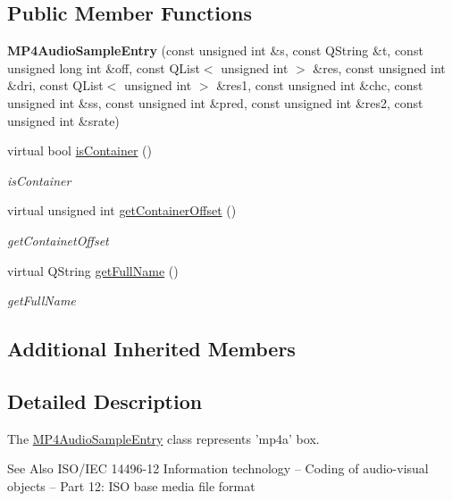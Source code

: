 \subsection*{Public Member Functions}
\begin{DoxyCompactItemize}
\item 
\hypertarget{class_m_p4_audio_sample_entry_a015738c8732d44118b8a543384e70ef2}{{\bfseries M\-P4\-Audio\-Sample\-Entry} (const unsigned int \&s, const Q\-String \&t, const unsigned long int \&off, const Q\-List$<$ unsigned int $>$ \&res, const unsigned int \&dri, const Q\-List$<$ unsigned int $>$ \&res1, const unsigned int \&chc, const unsigned int \&ss, const unsigned int \&pred, const unsigned int \&res2, const unsigned int \&srate)}\label{class_m_p4_audio_sample_entry_a015738c8732d44118b8a543384e70ef2}

\item 
virtual bool \hyperlink{class_m_p4_audio_sample_entry_a17ffcfa7b17574ed19bd38ccab77f705}{is\-Container} ()
\begin{DoxyCompactList}\small\item\em is\-Container \end{DoxyCompactList}\item 
virtual unsigned int \hyperlink{class_m_p4_audio_sample_entry_a81c5345f7b14c1fc8fe089dae5fd5793}{get\-Container\-Offset} ()
\begin{DoxyCompactList}\small\item\em get\-Containet\-Offset \end{DoxyCompactList}\item 
virtual Q\-String \hyperlink{class_m_p4_audio_sample_entry_a81d787d905a0ee6fe1158daf8cddb64d}{get\-Full\-Name} ()
\begin{DoxyCompactList}\small\item\em get\-Full\-Name \end{DoxyCompactList}\end{DoxyCompactItemize}
\subsection*{Additional Inherited Members}


\subsection{Detailed Description}
The \hyperlink{class_m_p4_audio_sample_entry}{M\-P4\-Audio\-Sample\-Entry} class represents 'mp4a' box. 

\begin{DoxySeeAlso}{See Also}
I\-S\-O/\-I\-E\-C 14496-\/12 Information technology – Coding of audio-\/visual objects – Part 12\-: I\-S\-O base media file format 
\end{DoxySeeAlso}


